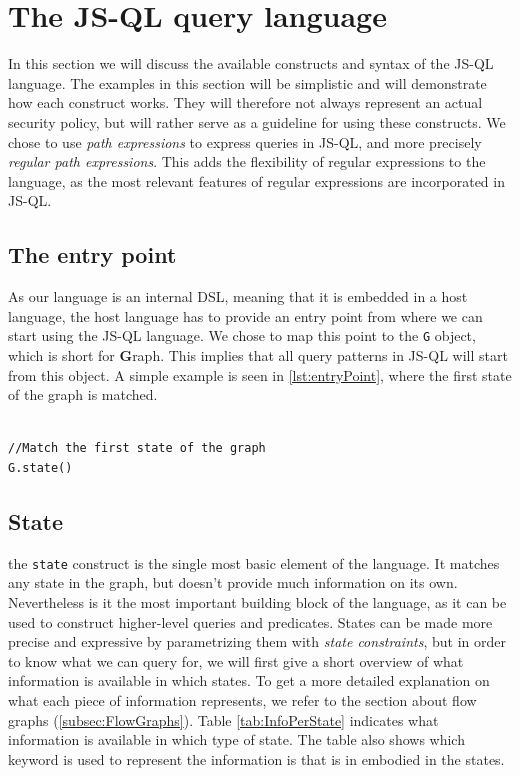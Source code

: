 \section{The JS-QL query language}
\label{sec:Syntax}
 In this section we will discuss the available constructs and syntax of the JS-QL language. The examples in this section will be simplistic and will demonstrate how each construct works. They will therefore not always represent an actual security policy, but will rather serve as a guideline for using these constructs. We chose to use \textit{path expressions} to express queries in JS-QL, and more precisely \textit{regular path expressions}. This adds the flexibility of regular expressions to the language, as the most relevant features of regular expressions are incorporated in JS-QL.

\subsection{The entry point}
As our language is an internal DSL, meaning that it is embedded in a host language, the host language has to provide an entry point from where we can start using the JS-QL language. We chose to map this point to the \texttt{G} object, which is short for \textbf{G}raph. This implies that all query patterns in JS-QL will start from this object. A simple example is seen in \ref{lst:entryPoint}, where the first state of the graph is matched.

\begin{lstlisting}[label={lst:entryPoint},language=JSQL,caption=Matching the first state starting from entry point \texttt{G},mathescape=true]  % float=t?

//Match the first state of the graph
G.state()
\end{lstlisting}

\subsection{State}
the \texttt{state} construct is the single most basic element of the language. It matches any state in the graph, but doesn't provide much information on its own. Nevertheless is it the most important building block of the language, as it can be used to construct higher-level queries and predicates. States can be made more precise and expressive by parametrizing them with \textit{state constraints}, but in order to know what we can query for, we will first give a short overview of what information is available in which states. To get a more detailed explanation on what each piece of information represents, we refer to the section about flow graphs (\ref{subsec:FlowGraphs}). Table \ref{tab:InfoPerState} indicates what information is available in which type of state. The table also shows which keyword is used to represent the information is that is in embodied in the states.

